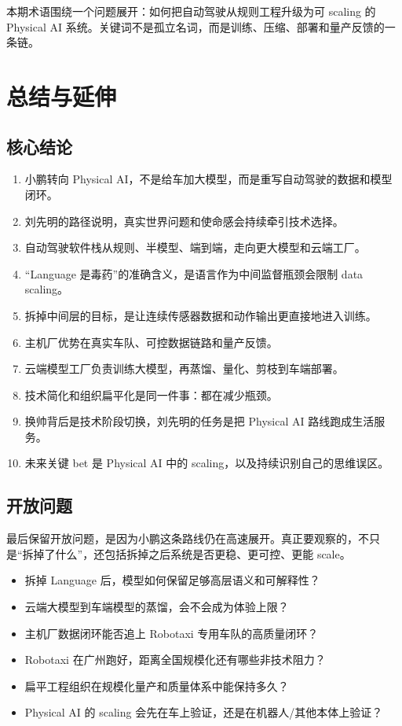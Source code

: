 \documentclass[a4paper]{article}
\begin{document}
本期术语围绕一个问题展开：如何把自动驾驶从规则工程升级为可 scaling 的 Physical AI 系统。关键词不是孤立名词，而是训练、压缩、部署和量产反馈的一条链。

\section{总结与延伸}

\subsection{核心结论}

\begin{enumerate}
\item 小鹏转向 Physical AI，不是给车加大模型，而是重写自动驾驶的数据和模型闭环。
\item 刘先明的路径说明，真实世界问题和使命感会持续牵引技术选择。
\item 自动驾驶软件栈从规则、半模型、端到端，走向更大模型和云端工厂。
\item “Language 是毒药”的准确含义，是语言作为中间监督瓶颈会限制 data scaling。
\item 拆掉中间层的目标，是让连续传感器数据和动作输出更直接地进入训练。
\item 主机厂优势在真实车队、可控数据链路和量产反馈。
\item 云端模型工厂负责训练大模型，再蒸馏、量化、剪枝到车端部署。
\item 技术简化和组织扁平化是同一件事：都在减少瓶颈。
\item 换帅背后是技术阶段切换，刘先明的任务是把 Physical AI 路线跑成生活服务。
\item 未来关键 bet 是 Physical AI 中的 scaling，以及持续识别自己的思维误区。
\end{enumerate}

\subsection{开放问题}

最后保留开放问题，是因为小鹏这条路线仍在高速展开。真正要观察的，不只是“拆掉了什么”，还包括拆掉之后系统是否更稳、更可控、更能 scale。

\begin{itemize}
\item 拆掉 Language 后，模型如何保留足够高层语义和可解释性？
\item 云端大模型到车端模型的蒸馏，会不会成为体验上限？
\item 主机厂数据闭环能否追上 Robotaxi 专用车队的高质量闭环？
\item Robotaxi 在广州跑好，距离全国规模化还有哪些非技术阻力？
\item 扁平工程组织在规模化量产和质量体系中能保持多久？
\item Physical AI 的 scaling 会先在车上验证，还是在机器人/其他本体上验证？
\end{itemize}
\end{document}
